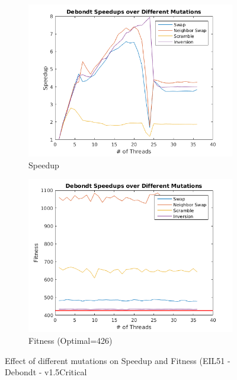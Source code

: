 \documentclass[10pt,letterpaper]{article}
\begin{document}
\begin{figure}[t]
\centering
   \begin{subfigure}{0.49\linewidth} \centering
	 \includegraphics[width=\textwidth]{../img/Debondt_mutations_speedup.png} 
     \caption{Speedup}\label{fig:figA}
   \end{subfigure}
   \begin{subfigure}{0.49\linewidth} \centering
	 \includegraphics[width=\textwidth]{../img/Debondt_mutations_fitness.png} 
     \caption{Fitness (Optimal=426)}\label{fig:figB}
   \end{subfigure}
\caption{Effect of different mutations on Speedup and Fitness (EIL51 - Debondt - v1.5Critical} \label{fig:mutations}
\end{figure}
\end{document}
